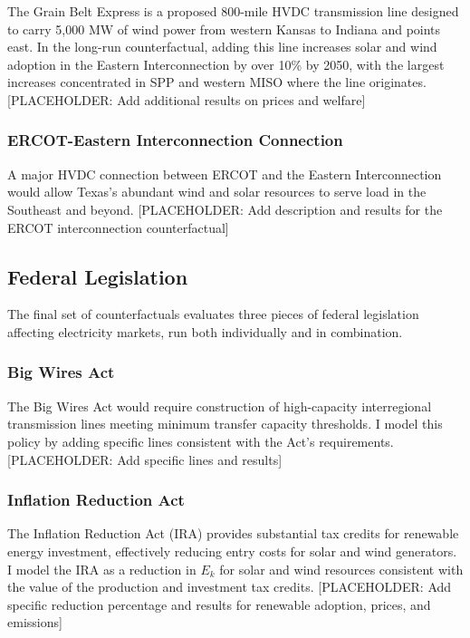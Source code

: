 \documentclass[12pt]{article}
\begin{document}
The Grain Belt Express is a proposed 800-mile HVDC transmission line designed to carry 5,000 MW of wind power from western Kansas to Indiana and points east. In the long-run counterfactual, adding this line increases solar and wind adoption in the Eastern Interconnection by over 10\% by 2050, with the largest increases concentrated in SPP and western MISO where the line originates. [PLACEHOLDER: Add additional results on prices and welfare]

\subsubsection{ERCOT-Eastern Interconnection Connection}

A major HVDC connection between ERCOT and the Eastern Interconnection would allow Texas's abundant wind and solar resources to serve load in the Southeast and beyond. [PLACEHOLDER: Add description and results for the ERCOT interconnection counterfactual]

\subsection{Federal Legislation}

The final set of counterfactuals evaluates three pieces of federal legislation affecting electricity markets, run both individually and in combination.

\subsubsection{Big Wires Act}

The Big Wires Act would require construction of high-capacity interregional transmission lines meeting minimum transfer capacity thresholds. I model this policy by adding specific lines consistent with the Act's requirements. [PLACEHOLDER: Add specific lines and results]

\subsubsection{Inflation Reduction Act}

The Inflation Reduction Act (IRA) provides substantial tax credits for renewable energy investment, effectively reducing entry costs for solar and wind generators. I model the IRA as a reduction in $E_k$ for solar and wind resources consistent with the value of the production and investment tax credits. [PLACEHOLDER: Add specific reduction percentage and results for renewable adoption, prices, and emissions]
\end{document}
